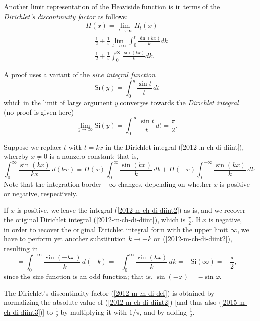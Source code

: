 Another limit representation of the Heaviside function is in terms of the
{\em Dirichlet's discontinuity factor} as follows:
\begin{equation}
\begin{split}
H(x)= \lim_{t \rightarrow \infty} H_t (x)
\\
= \frac{1}{2}+\frac{1}{\pi }\lim_{t \rightarrow \infty}\int_0^t \frac{\sin (kx)}{k} dk
\\
=
\frac{1}{2}+\frac{1}{\pi }\int_0^\infty \frac{\sin (kx)}{k} dk
.
\end{split}
\label{2012-m-ch-di-dcf}
\end{equation}

{\color{OliveGreen}
\bproof
A proof \cite{maor1998} uses a variant
of the {\em sine integral function}
\begin{equation}
\textrm{Si}(y) = \int_0^y \frac{\sin t}{t} \,dt
\end{equation}
which in the limit of large argument $y$ converges towards
the {\em Dirichlet integral}   (no proof is given here)
\begin{equation}
\lim_{y \rightarrow  \infty}\textrm{Si}(y) = \int_0^\infty  \frac{\sin t}{t} \,dt= \frac{\pi}{2}.
\label{2012-m-ch-di-diint}
\end{equation}


Suppose we
replace $t$ with $t=kx$
in the Dirichlet integral (\ref{2012-m-ch-di-diint}),
whereby $x\neq 0$ is a nonzero constant; that is,
\begin{equation}
\int_0^\infty  \frac{\sin (kx)}{kx} \,d(kx)
= H(x)\int_0^{\infty}  \frac{\sin (kx)}{k} \,dk
+H(-x)\int_0^{-\infty}  \frac{\sin (kx)}{k} \,dk
.
\label{2012-m-ch-di-diint2}
\end{equation}
Note that the integration border $\pm \infty$ changes, depending on whether $x$ is positive or negative,
respectively.

If $x$ is positive, we leave the integral
(\ref{2012-m-ch-di-diint2})
as is, and we recover the original Dirichlet integral (\ref{2012-m-ch-di-diint}),
which is $\frac{\pi}{2}$.
If $x$ is negative,
in order to recover the original Dirichlet integral form with the upper limit $\infty$,
we have to perform yet another substitution $k \rightarrow -k$
on (\ref{2012-m-ch-di-diint2}), resulting in
\begin{equation}
= \int_0^{-\infty}  \frac{\sin (-kx)}{-k} \,d(-k)
= -\int_0^{\infty}  \frac{\sin (kx)}{k} \,dk
= - \textrm{Si}(\infty ) =  -\frac{\pi}{2}
,
\label{2015-m-ch-di-diint3}
\end{equation}
since the sine function is an odd function; that is, $\sin(-\varphi )=-\sin \varphi $.


The Dirichlet's discontinuity factor (\ref{2012-m-ch-di-dcf})
is obtained by normalizing the absolute value of
(\ref{2012-m-ch-di-diint2}) [and thus also
(\ref{2015-m-ch-di-diint3})]
to $\frac{1}{2}$
by multiplying  it with $1/\pi$, and by adding $\frac{1}{2}$.
\eproof
}



